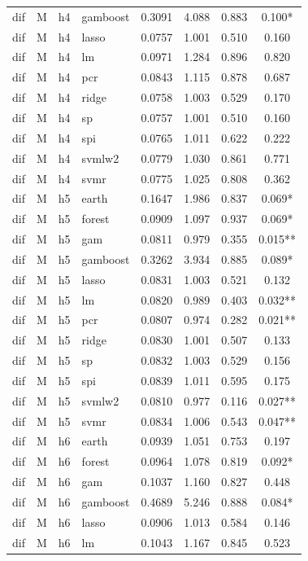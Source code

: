 \begin{ThreePartTable}
\begin{longtable}[t]{llclcccc}
dif & M & h4 & gamboost & 0.3091 & 4.088 & 0.883 & 0.100*\\
dif & M & h4 & lasso & 0.0757 & 1.001 & 0.510 & 0.160\\
dif & M & h4 & lm & 0.0971 & 1.284 & 0.896 & 0.820\\
dif & M & h4 & pcr & 0.0843 & 1.115 & 0.878 & 0.687\\
dif & M & h4 & ridge & 0.0758 & 1.003 & 0.529 & 0.170\\
dif & M & h4 & sp & 0.0757 & 1.001 & 0.510 & 0.160\\
dif & M & h4 & spi & 0.0765 & 1.011 & 0.622 & 0.222\\
dif & M & h4 & svmlw2 & 0.0779 & 1.030 & 0.861 & 0.771\\
dif & M & h4 & svmr & 0.0775 & 1.025 & 0.808 & 0.362\\
\addlinespace
dif & M & h5 & earth & 0.1647 & 1.986 & 0.837 & 0.069*\\
dif & M & h5 & forest & 0.0909 & 1.097 & 0.937 & 0.069*\\
dif & M & h5 & gam & 0.0811 & 0.979 & 0.355 & 0.015**\\
dif & M & h5 & gamboost & 0.3262 & 3.934 & 0.885 & 0.089*\\
dif & M & h5 & lasso & 0.0831 & 1.003 & 0.521 & 0.132\\
dif & M & h5 & lm & 0.0820 & 0.989 & 0.403 & 0.032**\\
dif & M & h5 & pcr & 0.0807 & 0.974 & 0.282 & 0.021**\\
dif & M & h5 & ridge & 0.0830 & 1.001 & 0.507 & 0.133\\
dif & M & h5 & sp & 0.0832 & 1.003 & 0.529 & 0.156\\
dif & M & h5 & spi & 0.0839 & 1.011 & 0.595 & 0.175\\
dif & M & h5 & svmlw2 & 0.0810 & 0.977 & 0.116 & 0.027**\\
dif & M & h5 & svmr & 0.0834 & 1.006 & 0.543 & 0.047**\\
\addlinespace
dif & M & h6 & earth & 0.0939 & 1.051 & 0.753 & 0.197\\
dif & M & h6 & forest & 0.0964 & 1.078 & 0.819 & 0.092*\\
dif & M & h6 & gam & 0.1037 & 1.160 & 0.827 & 0.448\\
dif & M & h6 & gamboost & 0.4689 & 5.246 & 0.888 & 0.084*\\
dif & M & h6 & lasso & 0.0906 & 1.013 & 0.584 & 0.146\\
dif & M & h6 & lm & 0.1043 & 1.167 & 0.845 & 0.523\\

\end{longtable}
\end{ThreePartTable}
